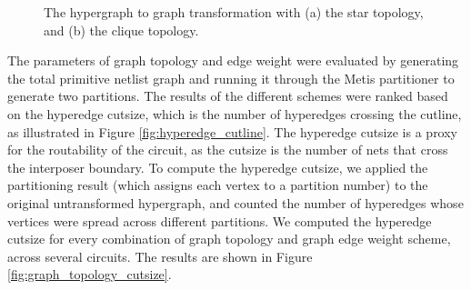 \begin{figure}[!htbp]
\centering
{}
\caption{The hypergraph to graph transformation with (a) the star topology, and (b) the clique topology.}
\label{fig:hyperedge_to_graph}
\end{figure}

The parameters of graph topology and edge weight were evaluated by generating the total primitive netlist graph and running it through the Metis partitioner to generate two partitions. The results of the different schemes were ranked based on the hyperedge cutsize, which is the number of hyperedges crossing the cutline, as illustrated in Figure \ref{fig:hyperedge_cutline}. The hyperedge cutsize is a proxy for the routability of the circuit, as the cutsize is the number of nets that cross the interposer boundary. To compute the hyperedge cutsize, we applied the partitioning result (which assigns each vertex to a partition number) to the original untransformed hypergraph, and counted the number of hyperedges whose vertices were spread across different partitions. We computed the hyperedge cutsize for every combination of graph topology and graph edge weight scheme, across several circuits. The results are shown in Figure \ref{fig:graph_topology_cutsize}.

